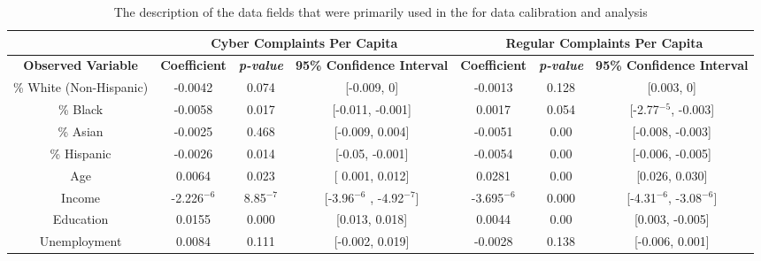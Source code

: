 \documentclass[conference]{IEEEtran}
\begin{document}
\begin{table}[h]
\noindent
\centering
\begin{tabular}{c||c|c|c||c|c|c}
\hline
\multicolumn{1}{c||}{\bfseries } & \multicolumn{3}{c||}{\bfseries Cyber Complaints Per Capita} & \multicolumn{3}{c}{\bfseries Regular Complaints Per Capita}\\
\hline
\bfseries Observed Variable & \bfseries Coefficient & \bfseries \emph{p-value} & \bfseries 95\% Confidence Interval & \bfseries Coefficient & \bfseries \emph{p-value} & \bfseries 95\% Confidence Interval \\
\hline
\% White (Non-Hispanic) & -0.0042 & 0.074 & [-0.009, 0] & -0.0013 &  0.128 & [0.003,  0]\\
\hline
\% Black & -0.0058 & 0.017 & [-0.011, -0.001] & 0.0017 & 0.054 & [-2.77$^{-5}$, -0.003]\\
\hline
\% Asian & -0.0025 & 0.468 & [-0.009, 0.004] & -0.0051 & 0.00 & [-0.008, -0.003]\\
\hline
\% Hispanic & -0.0026 & 0.014 & [-0.05, -0.001] & -0.0054 & 0.00 & [-0.006, -0.005]\\
\hline
Age & 0.0064 & 0.023 & [ 0.001, 0.012] & 0.0281 & 0.00 & [0.026, 0.030]\\
\hline
Income & -2.226$^{-6}$ & 8.85$^{-7}$ & [-3.96$^{-6}$ , -4.92$^{-7}$] & -3.695$^{-6}$ & 0.000  & [-4.31$^{-6}$, -3.08$^{-6}$]\\
\hline
Education & 0.0155 & 0.000 & [0.013, 0.018] & 0.0044 & 0.00 & [0.003, -0.005]\\
\hline
Unemployment & 0.0084 & 0.111 & [-0.002, 0.019] & -0.0028 & 0.138 & [-0.006, 0.001]\\
\hline
\end{tabular}

\vspace{8pt}
\caption{The description of the data fields that were primarily used in the for data calibration and analysis}\label{regressions}
\vspace{-20pt}
\end{table}
\end{document}
